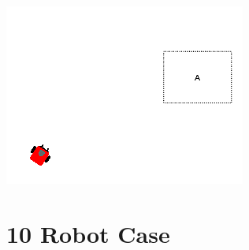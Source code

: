 \begin{minipage}{\linewidth}
	\centering
	\begin{minipage}{0.42\linewidth}
		\includegraphics[width=\linewidth]{../ui_experiment/slide_images/Swarm_Robot_Control_-_Single_Robot_0023.png}
		\label{fig:1_patrol_a}
	\end{minipage}
\end{minipage}


\section{10 Robot Case}

